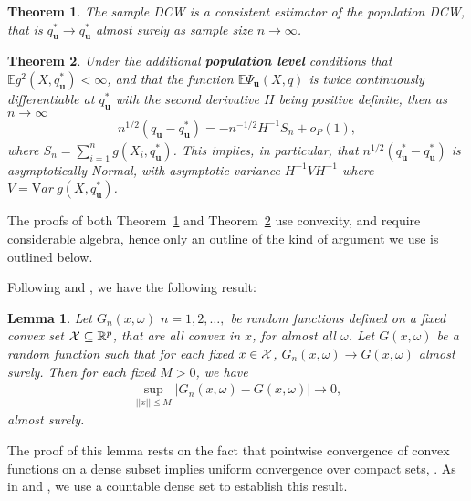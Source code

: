 \documentclass[twoside]{article}
\newtheorem{Theorem}{Theorem}[section]
\newtheorem{Lemma}{Lemma}[section]
\begin{document}
 
\begin{Theorem} \label{thm:Consistency}
The sample DCW is a consistent estimator of the population DCW, that is 
 $q_{\mathbf{u}}^{*} \rightarrow q_{\mathbf{u}}^{*}$ almost surely as 
sample size $n \rightarrow \infty$.
\end{Theorem}

\begin{Theorem} \label{thm:AsyNorm}
Under the additional {\bf population level} conditions that  
$\mathbb{E} g^{2} (X, q_{\mathbf{u}}^{*}) < \infty$,  and that
the function
$\mathbb{E} \Psi_{\mathbf{u}} (X, q) $ is twice continuously differentiable at $q_{\mathbf{u}}^{*}$ with the second
derivative $H$ being positive definite, then as $n \rightarrow \infty$
\begin{eqnarray*}
n^{1/2} ( q_{\mathbf{u}} - q_{\mathbf{u}}^{*}) 
= - n^{-1/2} H^{-1} S_{n} + o_{P} (1),
\end{eqnarray*}
where $S_{n} = \sum_{i=1}^{n} g(X_{i}, q_{\mathbf{u}}^{*})$.  
This implies, in particular, that
$n^{1/2} ( q_{\mathbf{u}}^{*} - q_{\mathbf{u}}^{*})$ is asymptotically Normal, with asymptotic variance
$H^{-1} V H^{-1}$ where $V = {\mathrm Var }\  g(X, q_{\mathbf{u}}^{*})$.
\end{Theorem}

The proofs of both Theorem~\ref{thm:Consistency} and Theorem~\ref{thm:AsyNorm} 
use convexity, and require considerable algebra, hence only an outline of the 
kind of argument we use is outlined below. 

Following \cite{Haberman89} and \cite{Niemiro92}, we have the following 
result:

\begin{Lemma}
Let $G_{n} (x, \omega)$ $n =1, 2, \ldots, $ be random functions defined on a fixed
convex set ${\cal{X}} \subseteq \mathbb{R}^{p}$, that are all convex in $x$, for almost 
all $\omega$. Let $G (x, \omega)$ be a random function such that for each fixed 
$x \in {\cal{X}}$, $G_{n} (x, \omega) \rightarrow G (x, \omega)$ almost surely. 
Then for each fixed $M > 0$, we have 
\begin{eqnarray*}
\sup_{ ||x|| \leq M} | G_{n} (x, \omega) - G (x, \omega) | \rightarrow 0, 
\end{eqnarray*}
almost surely. 
\end{Lemma}

The proof of this lemma rests on the fact that pointwise convergence of convex 
functions on a dense subset implies uniform convergence over compact sets, 
\cite{Rockafellar70}. As in \cite{Niemiro92} and \cite{Bose98}, 
we use a countable dense set to establish this result. 
\end{document}
